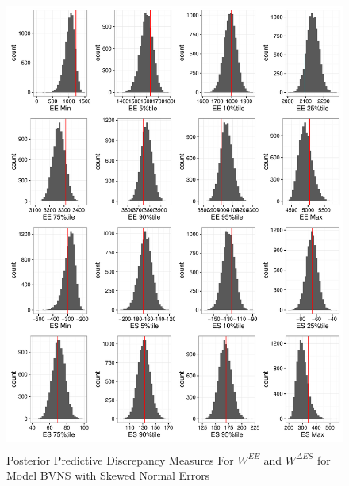 \documentclass[11pt]{article}\usepackage[]{graphicx}\usepackage[]{color}
\begin{document}
  \begin{figure}
  \centering
  \includegraphics[width=17cm,height=15cm]{manual_figure/wpwdiagbvns.pdf}
  \caption{Posterior Predictive Discrepancy Measures For $W^{EE}$ and $W^{\Delta ES}$ for Model BVNS with Skewed Normal Errors}
  \label{wpwdiagbvns}
  \end{figure}
\end{document}
